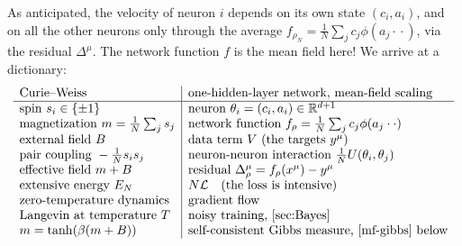 \documentclass[11pt]{article}
\newcommand{\R}{\mathbb{R}}
\newcommand{\CL}{{\mathcal L}}
\begin{document}
As anticipated, the velocity of neuron $i$ depends on its own state $(c_i,a_i)$, and on all the other neurons only through the average $f_{\rho_N} = \frac{1}{N}\sum_j c_j\phi(a_j\cdot{}\cdot)$, via the residual $\Delta^\mu$. %
The network function $f$ is the mean field here!  We arrive at a dictionary:
%
\begin{equation} \label{mf-dictionary}
\begin{array}{l|l}
    \text{Curie--Weiss} & \text{one-hidden-layer network, mean-field scaling} \\\hline
    \text{spin } s_i\in\{\pm1\} & \text{neuron } \theta_i=(c_i,a_i)\in\R^{d+1} \\
    \text{magnetization } m=\frac{1}{N}\sum_j s_j & \text{network function } f_{\rho}=\frac{1}{N}\sum_j c_j\phi(a_j\cdot{}\cdot) \\
    \text{external field } B & \text{data term } V \text{ (the targets } y^\mu\text{)} \\
    \text{pair coupling } -\tfrac{1}{N} s_is_j & \text{neuron-neuron interaction } \tfrac{1}{N} U(\theta_i,\theta_j) \\
    \text{effective field } m+B & \text{residual } \Delta^\mu_\rho = f_\rho(x^\mu)-y^\mu \\
    \text{extensive energy } E_N & N\CL \quad(\text{the loss is intensive}) \\
    \text{zero-temperature dynamics} & \text{gradient flow} \\
    \text{Langevin at temperature } T & \text{noisy training, \cref{sec:Bayes}} \\
    m = \tanh(\beta(m+B)) & \text{self-consistent Gibbs measure, \cref{mf-gibbs} below}
\end{array}
\end{equation}
%
\end{document}
